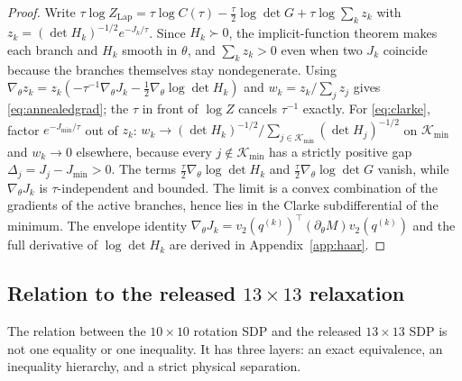 \begin{proof}
Write $\tau\log Z_{\mathrm{Lap}}=\tau\log C(\tau)-\frac{\tau}{2}\log\det G+\tau\log\sum_kz_k$ with $z_k=(\det H_k)^{-1/2}e^{-J_k/\tau}$. Since $H_k\succ0$, the implicit-function theorem makes each branch and $H_k$ smooth in $\theta$, and $\sum_kz_k>0$ even when two $J_k$ coincide because the branches themselves stay nondegenerate. Using $\nabla_\theta z_k=z_k(-\tau^{-1}\nabla_\theta J_k-\frac12\nabla_\theta\log\det H_k)$ and $w_k=z_k/\sum_jz_j$ gives \eqref{eq:annealedgrad}; the $\tau$ in front of $\log Z$ cancels $\tau^{-1}$ exactly. For \eqref{eq:clarke}, factor $e^{-J_{\min}/\tau}$ out of $z_k$: $w_k\to(\det H_k)^{-1/2}/\sum_{j\in\mathcal{K}_{\min}}(\det H_j)^{-1/2}$ on $\mathcal{K}_{\min}$ and $w_k\to0$ elsewhere, because every $j\notin\mathcal{K}_{\min}$ has a strictly positive gap $\Delta_j=J_j-J_{\min}>0$. The terms $\frac{\tau}{2}\nabla_\theta\log\det H_k$ and $\frac{\tau}{2}\nabla_\theta\log\det G$ vanish, while $\nabla_\theta J_k$ is $\tau$-independent and bounded. The limit is a convex combination of the gradients of the active branches, hence lies in the Clarke subdifferential of the minimum. The envelope identity $\nabla_\theta J_k=v_2(q^{(k)})^\top(\partial_\theta M)v_2(q^{(k)})$ and the full derivative of $\log\det H_k$ are derived in Appendix~\ref{app:haar}.
\end{proof}

\subsection{Relation to the released \texorpdfstring{$13\times13$}{13x13} relaxation}\label{sec:thirteen}

The relation between the $10\times10$ rotation SDP and the released $13\times13$ SDP is not one equality or one inequality. It has three layers: an exact equivalence, an inequality hierarchy, and a strict physical separation.

